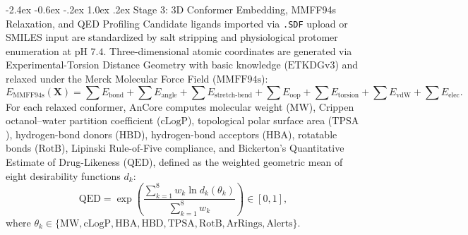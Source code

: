 \documentclass[11pt,a4paper]{article}
\makeatletter
\renewcommand{\subsection}{\@startsection{subsection}{2}{\z@}%
  {-2.4ex \@plus -0.6ex \@minus -.2ex}%
  {1.0ex \@plus .2ex}%
  {\normalfont\large\bfseries\color{primary}}}
\makeatother
\begin{document}
\subsection{Stage 3: 3D Conformer Embedding, MMFF94s Relaxation, and QED Profiling}
\noindent Candidate ligands imported via \texttt{.SDF} upload or SMILES input are standardized by salt stripping and physiological protomer enumeration at $\text{pH }7.4$. Three-dimensional atomic coordinates are generated via Experimental-Torsion Distance Geometry with basic knowledge ($\text{ETKDGv3}$) and relaxed under the Merck Molecular Force Field ($\text{MMFF94s}$):
\begin{equation}
E_{\text{MMFF94s}}(\mathbf{X}) = \sum E_{\text{bond}} + \sum E_{\text{angle}} + \sum E_{\text{stretch-bend}} + \sum E_{\text{oop}} + \sum E_{\text{torsion}} + \sum E_{\text{vdW}} + \sum E_{\text{elec}}.
\label{eq:mmff}
\end{equation}
For each relaxed conformer, AnCore computes molecular weight ($\text{MW}$), Crippen octanol--water partition coefficient ($\text{cLogP}$), topological polar surface area ($\text{TPSA}$), hydrogen-bond donors ($\text{HBD}$), hydrogen-bond acceptors ($\text{HBA}$), rotatable bonds ($\text{RotB}$), Lipinski Rule-of-Five compliance, and Bickerton's Quantitative Estimate of Drug-Likeness ($\text{QED}$), defined as the weighted geometric mean of eight desirability functions $d_k$:
\begin{equation}
\text{QED} = \exp\left( \frac{\sum_{k=1}^{8} w_k \ln d_k(\theta_k)}{\sum_{k=1}^{8} w_k} \right) \in [0, 1],
\label{eq:qed}
\end{equation}
where $\theta_k \in \{\text{MW}, \text{cLogP}, \text{HBA}, \text{HBD}, \text{TPSA}, \text{RotB}, \text{ArRings}, \text{Alerts}\}$.
\end{document}

